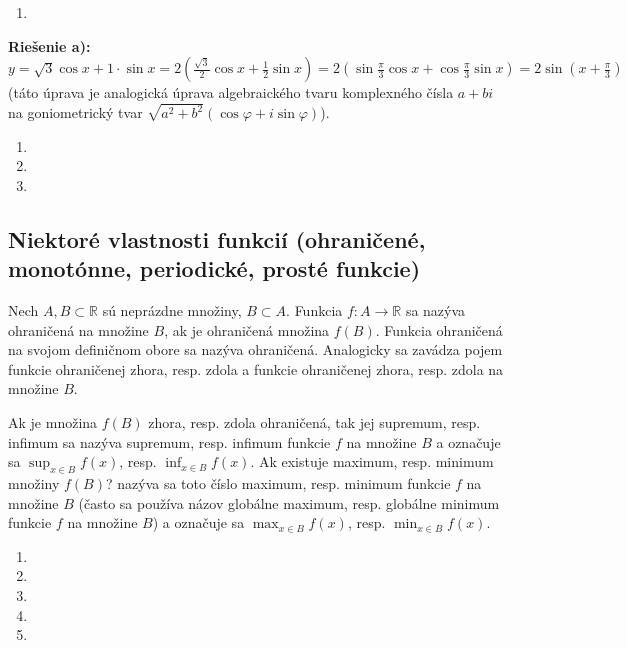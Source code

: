 \begin{enumerate}[resume]
  \item {}
\end{enumerate}

\textbf{Riešenie a):} $y=\sqrt{3}\cos x +1\cdot\sin x=2(\frac{\sqrt{3}}{2}\cos x +\frac{1}{2}\sin x)=2(\sin \frac{\pi}{3}\cos x +\cos \frac{\pi}{3}\sin x)=2\sin (x+\frac{\pi}{3})$ (táto úprava je analogická úprava algebraického tvaru komplexného čísla $a+bi$ na goniometrický tvar $\sqrt{a^2+b^2}(\cos\varphi +i\sin\varphi)$).

\begin{enumerate}[resume]
  \item {}
  \item {}
  \item {}
\end{enumerate}


\subsection{Niektoré vlastnosti funkcií (ohraničené, monotónne, periodické, prosté funkcie)}

Nech $A,B\subset\mathbb{R}$ sú neprázdne množiny, $B\subset A$. Funkcia $f:A\rightarrow\mathbb{R}$ sa nazýva ohraničená na množine $B$, ak je ohraničená množina $f(B)$. Funkcia ohraničená na svojom definičnom obore sa nazýva ohraničená. Analogicky sa zavádza pojem funkcie ohraničenej zhora, resp. zdola a funkcie ohraničenej zhora, resp. zdola na množine $B$.

Ak je množina $f(B)$ zhora, resp. zdola ohraničená, tak jej supremum, resp. infimum sa nazýva supremum, resp. infimum funkcie $f$ na množine $B$ a označuje sa $\sup_{x\in B} f(x)$, resp. $\inf_{x\in B} f(x)$. Ak existuje maximum, resp. minimum množiny $f(B)$? nazýva sa toto číslo maximum, resp. minimum funkcie $f$ na množine $B$ (často sa používa názov globálne maximum, resp. globálne minimum funkcie $f$ na množine $B$) a označuje sa $\max_{x\in B}f(x)$, resp. $\min_{x\in B}f(x)$.


\begin{enumerate}[resume]
  \item {}
  \item {}
  \item {}
  \item {}
  \item {}
\end{enumerate}

